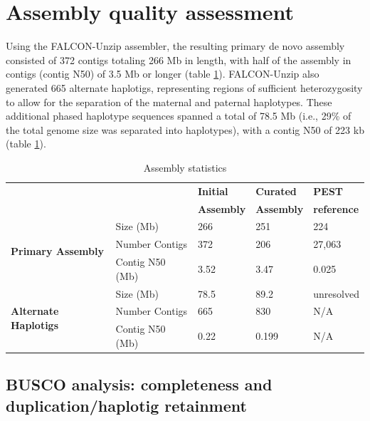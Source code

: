 \section{Assembly quality assessment}


\par{
Using the FALCON-Unzip assembler\cite{falcon}, the resulting primary de novo assembly consisted of 372 contigs totaling 266 Mb in length, with half of the assembly in contigs (contig N50) of 3.5 Mb or longer (table \ref{table:assemblydata}). FALCON-Unzip also generated 665 alternate haplotigs, representing regions of sufficient heterozygosity to allow for the separation of the maternal and paternal haplotypes. These additional phased haplotype sequences spanned a total of 78.5 Mb (i.e., 29\% of the total genome size was separated into haplotypes), with a contig N50 of 223 kb (table \ref{table:assemblydata}). 
}


\begin{table}[htbp!]
\caption{Assembly statistics}\label{table:assemblydata}
\begin{center}
\begin{tabular}{ | l | l | l | l | l |}
\hline
\multicolumn{2}{|c|}{} & \textbf{Initial} & \textbf{Curated} & \textbf{PEST} \\
\multicolumn{2}{|c|}{} & \textbf{Assembly} & \textbf{Assembly} & \textbf{reference} \\
\hline
\multirow{3}{5em}{\textbf{Primary Assembly}}
& Size (Mb) & 266 & 251 & 224 \\
\cline{2-5}
& Number Contigs & 372 & 206 & 27,063 \\
\cline{2-5}
& Contig N50 (Mb) & 3.52	& 3.47	& 0.025 \\
\hline%
\multirow{3}{5em}{\textbf{Alternate Haplotigs}}
& Size (Mb) & 78.5 & 	89.2	& unresolved \\
\cline{2-5}
& Number Contigs & 665 &	830& 	N/A \\
\cline{2-5}
& Contig N50 (Mb) & 0.22	& 0.199	& N/A \\
\hline
\end{tabular}
\end{center}
\end{table}




\subsection{BUSCO analysis: completeness and duplication/haplotig retainment}

